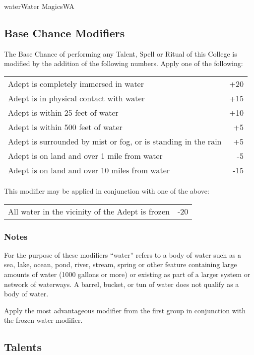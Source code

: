 \begin{college}[1.3]{water}{Water Magics}{WA}
\subsection{Base Chance Modifiers}

The Base Chance of performing any Talent, Spell or Ritual of this
College is modified by the addition of the following numbers. Apply
one of the following:

\begin{tabularx}{\linewidth}{Xr}
Adept is completely immersed in water			& +20 \\
Adept is in physical contact with water			& +15 \\ 
Adept is within 25 feet of water			& +10 \\
Adept is within 500 feet of water			& +5 \\
Adept is surrounded by mist or fog, or is standing in the rain & +5 \\
Adept is on land and over 1 mile from water		& -5 \\
Adept is on land and over 10 miles from water		& -15 \\
\end{tabularx}

This modifier may be applied in conjunction with one of the above:

\begin{tabularx}{\linewidth}{Xr}
All water in the vicinity of the Adept is frozen	& -20 \\
\end{tabularx}

\subsubsection{Notes}
\begin{Enumerate}
\item
For the purpose of these modifiers ``water'' refers to a body of water
such as a sea, lake, ocean, pond, river, stream, spring or other
feature containing large amounts of water (1000 gallons or more) or
existing as part of a larger system or network of waterways. A barrel,
bucket, or tun of water does not qualify as a body of water.

\item
Apply the most advantageous modifier from the first group in
conjunction with the frozen water modifier.
\end{Enumerate}

\subsection{Talents}


\end{college}
